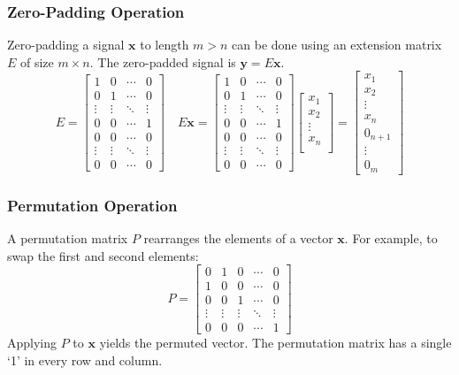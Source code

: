 \subsubsection*{Zero-Padding Operation}
Zero-padding a signal \( \mathbf{x} \) to length \( m > n \) can be done using an extension matrix \( E \) of size \( m \times n \). The zero-padded signal is \( \mathbf{y} = E\mathbf{x} \).
\[ E = \begin{bmatrix}
1 & 0 & \cdots & 0 \\
0 & 1 & \cdots & 0 \\
\vdots & \vdots & \ddots & \vdots \\
0 & 0 & \cdots & 1 \\
0 & 0 & \cdots & 0 \\
\vdots & \vdots & \ddots & \vdots \\
0 & 0 & \cdots & 0
\end{bmatrix}\quad E\mathbf{x}= \begin{bmatrix}
1 & 0 & \cdots & 0 \\
0 & 1 & \cdots & 0 \\
\vdots & \vdots & \ddots & \vdots \\
0 & 0 & \cdots & 1 \\
0 & 0 & \cdots & 0 \\
\vdots & \vdots & \ddots & \vdots \\
0 & 0 & \cdots & 0
\end{bmatrix} \begin{bmatrix}
    x_1 \\ x_2 \\ \vdots \\ x_n \\ 
\end{bmatrix} =\begin{bmatrix}
    x_1 \\ x_2 \\ \vdots \\ x_n \\ 0_{n+1} \\ \vdots \\ 0_m
\end{bmatrix}
\]

\subsubsection*{Permutation Operation}
A permutation matrix \( P \) rearranges the elements of a vector \( \mathbf{x} \). For example, to swap the first and second elements:
\[ P = \begin{bmatrix}
0 & 1 & 0 & \cdots & 0 \\
1 & 0 & 0 & \cdots & 0 \\
0 & 0 & 1 & \cdots & 0 \\
\vdots & \vdots & \vdots & \ddots & \vdots \\
0 & 0 & 0 & \cdots & 1
\end{bmatrix} \]
Applying \( P \) to \( \mathbf{x} \) yields the permuted vector. The permutation matrix has a single `1' in every row and column.

